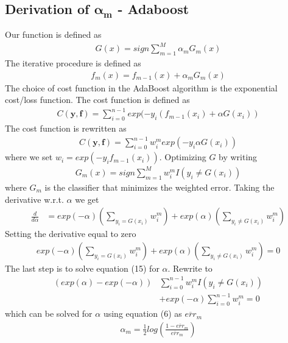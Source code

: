 \documentclass[a4paper,twocolumn]{article}
\begin{document}
\begin{appendices}
    \section{Derivation of $\mathbf{\alpha_{m}}$ - Adaboost}\label{app:A}
    Our function is defined as 
    \begin{align}
        G(x)=sign\sum_{m=1}^{M}\alpha_{m}G_{m}(x)
    \end{align}
    The iterative procedure is defined as
    \begin{align}
        f_{m}(x) = f_{m-1}(x) + \alpha_{m}G_{m}(x)
    \end{align}
    The choice of cost function in the AdaBoost algorithm is the exponential cost/loss function. The cost function is defined as
    \begin{align}
        C(\mathbf{y}, \mathbf{f}) = \sum_{i=0}^{n-1}exp(-y_{i}(f_{m-1}(x_{i})+\alpha G(x_{i}))
    \end{align}
    The cost function is rewritten as
    \begin{align}
        C(\mathbf{y}, \mathbf{f}) = \sum_{i=0}^{n-1}w_{i}^{m}exp(-y_{i}\alpha G(x_{i}))
    \end{align}
    where we set $w_{i}=exp(-y_{i}f_{m-1}(x_{i}))$. Optimizing $G$ by writing 
    \begin{align}
        G_{m}(x)=sign\sum_{m=1}^{M}w_{i}^{m}I(y_{i} \neq G(x_{i}))
    \end{align}
    where $G_{m}$ is the classifier that minimizes the weighted error. Taking the derivative w.r.t. $\alpha$ we get
    \begin{align}
        \frac{d}{d\alpha} &= exp(-\alpha)\left(\sum_{y_{i}=G({x}_{i})} w_{i}^{m}\right) + exp(\alpha)\left(\sum_{y_{i}\neq G({x}_{i})} w_{i}^{m}\right)
    \end{align}
    Setting the derivative equal to zero
    \begin{align}
        exp(-\alpha)\left(\sum_{y_{i}=G({x}_{i})} w_{i}^{m}\right) + exp(\alpha)\left(\sum_{y_{i}\neq G({x}_{i})} w_{i}^{m}\right) = 0
    \end{align}
    The last step is to solve equation (15) for $\alpha$. Rewrite to
    \begin{align*}
        (exp(\alpha) - exp(-\alpha))&\sum_{i=0}^{n-1}w_{i}^{m}I(y_{i} \neq G(x_{i}))\\
        &+ exp(-\alpha)\sum_{i=0}^{n-1}w_{i}^{m} = 0
    \end{align*}
    which can be solved for $\alpha$ using equation (6) as $\overline{err}_{m}$
    \begin{align}
        \alpha_{m} = \frac{1}{2}log\left(\frac{1- \overline{err}_{m}}{\overline{err}_{m}}\right)
    \end{align}
    \newpage
    \onecolumn

\end{appendices}
\end{document}
